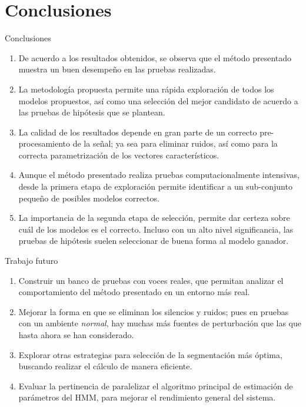 
\section{Conclusiones}

\begin{frame}{Conclusiones}
  \begin{enumerate}
    \itemsep0.8em
    \item De acuerdo a los resultados obtenidos, se observa que el método presentado muestra un buen desempeño en las pruebas realizadas. 

    \item La metodología propuesta permite una rápida exploración de todos los modelos propuestos, así como una selección del mejor candidato de acuerdo a las pruebas de hipótesis que se plantean.

    \item La calidad de los resultados depende en gran parte de un correcto pre-procesamiento de la señal; ya sea para eliminar ruidos, así como para la correcta parametrización de los vectores característicos.

    \item Aunque el método presentado realiza pruebas computacionalmente intensivas, desde la primera etapa de exploración permite identificar a un sub-conjunto pequeño de posibles modelos correctos.

    \item La importancia de la segunda etapa de selección, permite dar certeza sobre cuál de los modelos es el correcto. Incluso con un alto nivel significancia, las pruebas de hipótesis suelen seleccionar de buena forma al modelo ganador.
  \end{enumerate}
\end{frame}

\begin{frame}{Trabajo futuro}
\begin{enumerate}
    \itemsep0.8em

    \item Construir un banco de pruebas con voces reales, que permitan analizar el comportamiento del método presentado en un entorno más real.

    \item Mejorar la forma en que se eliminan los silencios y ruidos; pues en pruebas con un ambiente \textit{normal}, hay muchas más fuentes de perturbación que las que hasta ahora se han considerado. 

    \item Explorar otras estrategias para selección de la segmentación más óptima, buscando realizar el cálculo de manera eficiente.

    \item Evaluar la pertinencia de paralelizar el algoritmo principal de estimación de parámetros del HMM, para mejorar el rendimiento general del sistema.
\end{enumerate}
\end{frame}